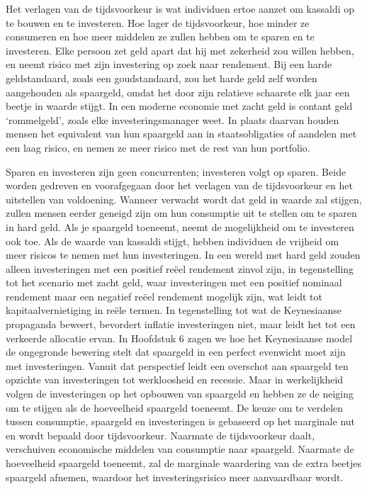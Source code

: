 Het verlagen van de tijdsvoorkeur is wat individuen ertoe aanzet om kassaldi op te bouwen en te investeren. Hoe lager de tijdsvoorkeur, hoe minder ze consumeren en hoe meer middelen ze zullen hebben om te sparen en te investeren. Elke persoon zet geld apart dat hij met zekerheid zou willen hebben, en neemt risico met zijn investering op zoek naar rendement. Bij een harde geldstandaard, zoals een goudstandaard, zou het harde geld zelf worden aangehouden als spaargeld, omdat het door zijn relatieve schaarste elk jaar een beetje in waarde stijgt. In een moderne economie met zacht geld is contant geld `rommelgeld', zoals elke investeringsmanager weet. In plaats daarvan houden mensen het equivalent van hun spaargeld aan in staatsobligaties of aandelen met een laag risico, en nemen ze meer risico met de rest van hun portfolio.

Sparen en investeren zijn geen concurrenten; investeren volgt op sparen. Beide worden gedreven en voorafgegaan door het verlagen van de tijdsvoorkeur en het uitstellen van voldoening. Wanneer verwacht wordt dat geld in waarde zal stijgen, zullen mensen eerder geneigd zijn om hun consumptie uit te stellen om te sparen in hard geld. Als je spaargeld toeneemt, neemt de mogelijkheid om te investeren ook toe. Als de waarde van kassaldi stijgt, hebben individuen de vrijheid om meer risico\textquotesingle s te nemen met hun investeringen. In een wereld met hard geld zouden alleen investeringen met een positief reëel rendement zinvol zijn, in tegenstelling tot het scenario met zacht geld, waar investeringen met een positief nominaal rendement maar een negatief reëel rendement mogelijk zijn, wat leidt tot kapitaalvernietiging in reële termen. In tegenstelling tot wat de Keynesiaanse propaganda beweert, bevordert inflatie investeringen niet, maar leidt het tot een verkeerde allocatie ervan. In Hoofdstuk 6 zagen we hoe het Keynesiaanse model de ongegronde bewering stelt dat spaargeld in een perfect evenwicht moet zijn met investeringen. Vanuit dat perspectief leidt een overschot aan spaargeld ten opzichte van investeringen tot werkloosheid en recessie. Maar in werkelijkheid volgen de investeringen op het opbouwen van spaargeld en hebben ze de neiging om te stijgen als de hoeveelheid spaargeld toeneemt. De keuze om te verdelen tussen consumptie, spaargeld en investeringen is gebaseerd op het marginale nut en wordt bepaald door tijdsvoorkeur. Naarmate de tijdsvoorkeur daalt, verschuiven economische middelen van consumptie naar spaargeld. Naarmate de hoeveelheid spaargeld toeneemt, zal de marginale waardering van de extra beetjes spaargeld afnemen, waardoor het investeringsrisico meer aanvaardbaar wordt.

